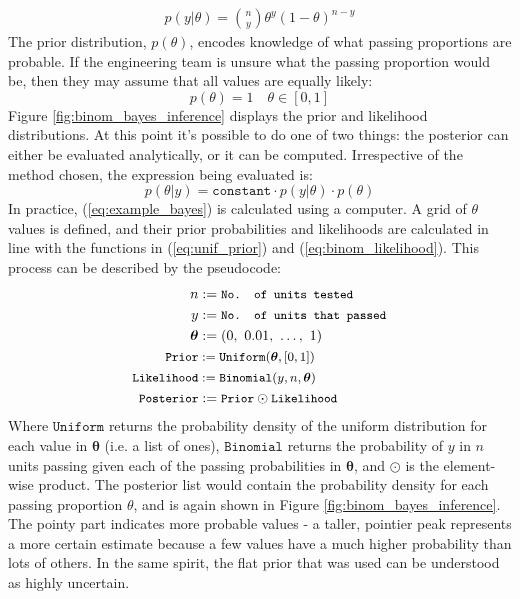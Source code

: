 \documentclass[11pt,a4paper,article]{memoir} %
\begin{document}
\begin{gather}
  p(y|\theta) = \binom{n}{y} \theta^y (1 - \theta)^{n - y}
  \label{eq:binom_likelihood}
\end{gather}
The prior distribution, $p(\theta)$, encodes knowledge of what passing proportions are probable. If the engineering team is unsure what the passing proportion would be, then they may assume that all values are equally likely:
\begin{equation}
  p(\theta) = 1 \quad \theta \in [0, 1]
  \label{eq:unif_prior}
\end{equation}
Figure \ref{fig:binom_bayes_inference} displays the prior and likelihood distributions. At this point it's possible to do one of two things: the posterior can either be evaluated analytically, or it can be computed. Irrespective of the method chosen, the expression being evaluated is:
\begin{equation}
	p(\theta|y) = \texttt{constant}\cdot p(y|\theta) \cdot p(\theta)
	\label{eq:example_bayes}
\end{equation}
In practice, (\ref{eq:example_bayes}) is calculated using a computer. A grid of $\theta$ values is defined, and their prior probabilities and likelihoods are calculated in line with the functions in (\ref{eq:unif_prior}) and (\ref{eq:binom_likelihood}). This process can be described by the pseudocode:
\begin{align}
  \quad n &:= \small{\texttt{No. of units tested}} \\
   \quad y &:= \small{\texttt{No. of units that passed}} \\
  \boldsymbol{\theta} & := (0, \ 0.01, \ \dots, \ 1) \\
  \small{\texttt{Prior}} &:= \small{\texttt{Uniform}}(\boldsymbol{\theta}, [0, 1]) \\
  \small{\texttt{Likelihood}} &:= \small{\texttt{Binomial}}(y, n, \boldsymbol{\theta}) \\ 
  \small{\texttt{Posterior}} &:= \small{\texttt{Prior} \odot \texttt{Likelihood}}
\end{align}
Where $\texttt{Uniform}$ returns the probability density of the uniform distribution for each value in $\boldsymbol{\theta}$ (i.e. a list of ones), $\texttt{Binomial}$ returns the probability of $y$ in $n$ units passing given each of the passing probabilities in $\boldsymbol{\theta}$, and $\odot$ is the element-wise product.
The posterior list would contain the probability density for each passing proportion $\theta$, and is again shown in Figure \ref{fig:binom_bayes_inference}. The pointy part indicates more probable values - a taller, pointier peak represents a more certain estimate because a few values have a much higher probability than lots of others. In the same spirit, the flat prior that was used can be understood as highly uncertain.
\end{document}
